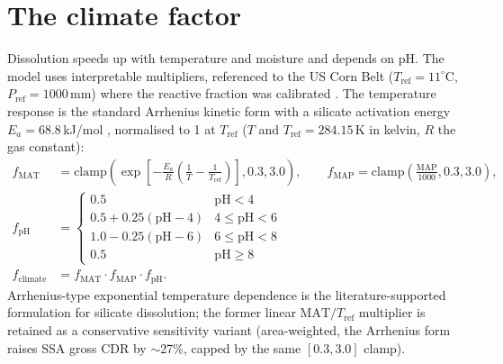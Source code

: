 \documentclass[openany]{book}
\begin{document}
\section{The climate factor}

Dissolution speeds up with temperature and moisture and depends on pH. The model
uses interpretable multipliers, referenced to the US Corn Belt ($T_{\text{ref}}
= 11^{\circ}$C, $P_{\text{ref}} = 1000$\,mm) where the reactive fraction was
calibrated \citep{lewis2021}. The temperature response is the standard Arrhenius
kinetic form with a silicate activation energy $E_a = 68.8$\,kJ/mol
\citep{whiteblum1995}, normalised to 1 at $T_{\text{ref}}$ ($T$ and
$T_{\text{ref}} = 284.15$\,K in kelvin, $R$ the gas constant):
%
\begin{align}
f_{\text{MAT}} &= \mathrm{clamp}\!\left(
  \exp\!\left[-\frac{E_a}{R}\left(\frac{1}{T}-\frac{1}{T_{\text{ref}}}\right)\right],
  0.3, 3.0\right),
\qquad
f_{\text{MAP}} = \mathrm{clamp}\!\left(\frac{\mathrm{MAP}}{1000}, 0.3, 3.0\right),
\label{eq:fmatmap}\\[2pt]
f_{\text{pH}} &=
\begin{cases}
0.5 & \mathrm{pH} < 4\\
0.5 + 0.25(\mathrm{pH}-4) & 4 \le \mathrm{pH} < 6\\
1.0 - 0.25(\mathrm{pH}-6) & 6 \le \mathrm{pH} < 8\\
0.5 & \mathrm{pH} \ge 8
\end{cases}
\label{eq:fph}\\[2pt]
f_{\text{climate}} &= f_{\text{MAT}}\cdot f_{\text{MAP}}\cdot f_{\text{pH}}.
\label{eq:fclimate}
\end{align}
%
Arrhenius-type exponential temperature dependence is the literature-supported
formulation for silicate dissolution; the former linear $\mathrm{MAT}/T_{\text{ref}}$
multiplier is retained as a conservative sensitivity variant (area-weighted, the
Arrhenius form raises SSA gross CDR by $\sim$27\%, capped by the same
$[0.3, 3.0]$ clamp).
\end{document}
